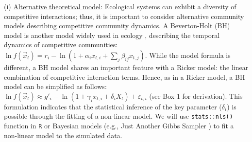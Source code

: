 \documentclass[12pt, class=article, crop=false]{standalone}
\begin{document}
(i) \ul{Alternative theoretical model}:
Ecological systems can exhibit a diversity of competitive interactions; thus, it is important to consider alternative community models describing competitive community dynamics. 
A Beverton-Holt (BH) model is another model widely used in ecology \citep{otto_biologists_2011}, describing the temporal dynamics of competitive communities: $\ln f(\overset{\rightarrow}{x}_{t}) = r_i - \ln(1 + \alpha_i x_{t,i} + \sum_j \beta_{ij} x_{t,j})$. 
While the model formula is different, a BH model shares an important feature with a Ricker model: the linear combination of competitive interaction terms.
Hence, as in a Ricker model, a BH model can be simplified as follows: $\ln f(\overset{\rightarrow}{x}_{t}) \approx g'_{i} - \ln(1 + \gamma_i x_{t,i} + \delta_i X_t) + \varepsilon_{t,i}$ (see Box 1 for derivation).
This formulation indicates that the statistical inference of the key parameter ($\delta_i$) is possible through the fitting of a non-linear model.
We will use \texttt{stats::nls()} function in \texttt{R} or Bayesian models (e.g., Just Another Gibbs Sampler \citep{plummer_jags_2003}) to fit a non-linear model to the simulated data.
\end{document}
